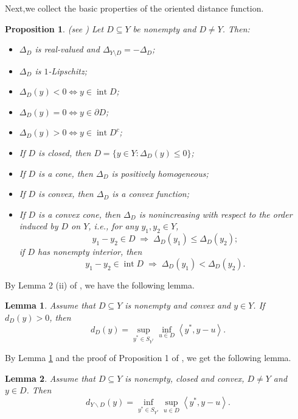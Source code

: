 \documentclass[10pt,a4paper]{amsart}
\newtheorem{lemma}{Lemma}[section]
\newtheorem{proposition}{Proposition}[section]
\begin{document}
Next,we collect the basic properties of the oriented distance function.
\begin{proposition}  (see \cite{XuLi2016, KTZ2015, Zaffaroni2003})  \label{XSQ}
	Let $D \subseteq Y$ be nonempty and $D \neq Y$. Then:
	\begin{itemize}
		\item[(i)] $\Delta_D$ is real-valued and $\Delta_{Y \setminus D} = -\Delta_D$;
		\item[(ii)] $\Delta_D$ is $1$-Lipschitz;
		\item[(iii)] $\Delta_D(y) < 0 \Leftrightarrow y \in \operatorname{int} D$;
		\item[(iv)] $\Delta_D(y) = 0 \Leftrightarrow y \in \partial D$;
		\item[(v)] $\Delta_D(y) > 0 \Leftrightarrow y \in \operatorname{int} D^c$;
		\item[(vi)] If $D$ is closed, then $D = \{y \in Y : \Delta_D(y) \leq 0\}$;
		\item[(vii)] If $D$ is a cone, then $\Delta_D$ is positively homogeneous;
		\item[(viii)] If $D$ is convex, then $\Delta_D$ is a convex function;
		\item[(ix)] If $D$ is a convex cone, then $\Delta_D$ is nonincreasing with respect to the order induced by $D$ on $Y$, i.e., for any $y_1, y_2 \in Y$,
		\[
		y_1 - y_2 \in D \;\Longrightarrow\; \Delta_D(y_1) \leq \Delta_D(y_2);
		\]
		if $D$ has nonempty interior, then
		\[
		y_1 - y_2 \in \operatorname{int} D \;\Longrightarrow\; \Delta_D(y_1) < \Delta_D(y_2).
		\]
	\end{itemize}
\end{proposition}




By Lemma 2 (ii) of \cite{LiuNgYang2009}, we have the following lemma.

\begin{lemma}  \label{QWED} Assume that  $D \subseteq Y$  is nonempty and convex and  $y \in Y$. If ${d_D}\left( y \right) > 0$,  then
	$${d_D}\left( y \right) = \mathop {\sup }\limits_{{y^*} \in {S_{{Y^*}}}} \mathop {\inf }\limits_{u \in D} \left\langle {{y^*},y - u} \right\rangle .$$	
\end{lemma}

By Lemma  \ref{QWED} and the proof of Proposition 1  of \cite{LiuNgYang2009}, we   get the following lemma.  
\begin{lemma}  \label{QWAD} Assume that  $D \subseteq Y$  is nonempty, closed and convex, $D \ne Y$
	and  $y \in D$. Then
	$${d_{Y\backslash D}}(y) = \mathop {\inf }\limits_{{y^*} \in {S_{{Y^*}}}} \mathop {\sup }\limits_{u \in D} \left\langle {{y^*},y - u} \right\rangle .$$
\end{lemma}
 
\end{document}
